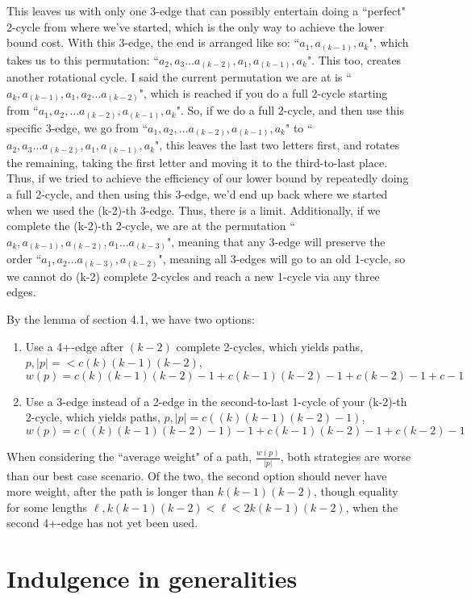 \documentclass{article}
\newcommand{\edit}[1]{}%
\begin{document}
This leaves us with only one 3-edge that can possibly entertain doing a ``perfect" 2-cycle from where we've started, which is the only way to achieve the lower bound cost. With this 3-edge, the end is arranged like so: ``$a_1,a_{(k-1)},a_k$", which takes us to this permutation: ``$a_2,a_3\dots a_{(k-2)},a_1,a_{(k-1)},a_k$". This too, creates another rotational cycle. I said the current permutation we are at is ``$a_k,a_{(k-1)},a_1, a_2 \dots  a_{(k-2)}$", which is reached if you do a full 2-cycle starting from ``$a_1,a_2,\dots  a_{(k-2)},a_{(k-1)},a_k$". So, if we do a full 2-cycle, and then use this specific 3-edge, we go from ``$a_1,a_2,\dots  a_{(k-2)},a_{(k-1)},a_k$" to ``$a_2,a_3\dots a_{(k-2)},a_1,a_{(k-1)},a_k$", this leaves the last two letters first, and rotates the remaining, taking the first letter and moving it to the third-to-last place. Thus, if we tried to achieve the efficiency of our lower bound by repeatedly doing a full 2-cycle, and then using this 3-edge, we'd end up back where we started when we used the (k-2)-th 3-edge. Thus, there is a limit. Additionally, if we complete the (k-2)-th 2-cycle, we are at the permutation ``$a_k,a_{(k-1)},a_{(k-2)},a_1\dots  a_{(k-3)}$", meaning that any 3-edge will preserve the order ``$a_1,a_2\dots  a_{(k-3)},a_{(k-2)}$", meaning all 3-edges will go to an old 1-cycle, so we cannot do (k-2) complete 2-cycles and reach a new 1-cycle via any three edges.

By the lemma of section 4.1, we have two options:\edit{ we will actually establish multiple lemmas}

\begin{enumerate}
    \item Use a 4+-edge after $(k-2)$ complete 2-cycles, which yields paths, $p, |p| =< c(k)(k-1)(k-2)$, $w(p) = c(k)(k-1)(k-2)-1 + c(k-1)(k-2)-1 + c(k-2)-1 + c-1$
    \item Use a 3-edge instead of a 2-edge in the second-to-last 1-cycle of your (k-2)-th 2-cycle, which yields paths, $p, |p| = c((k)(k-1)(k-2)-1)$, $w(p) = c((k)(k-1)(k-2)-1)-1 + c(k-1)(k-2)-1 + c(k-2)-1$
\end{enumerate}
When considering the ``average weight" of a path, $\frac{w(p)}{|p|}$, both strategies are worse than our best case scenario. Of the two, the second option should never have more weight, after the path is longer than $k(k-1)(k-2)$, though equality for some lengths $\ell, k(k-1)(k-2) < \ell < 2k(k-1)(k-2)$, when the second 4+-edge has not yet been used.


\section{Indulgence in generalities} \label{formality}
\end{document}
